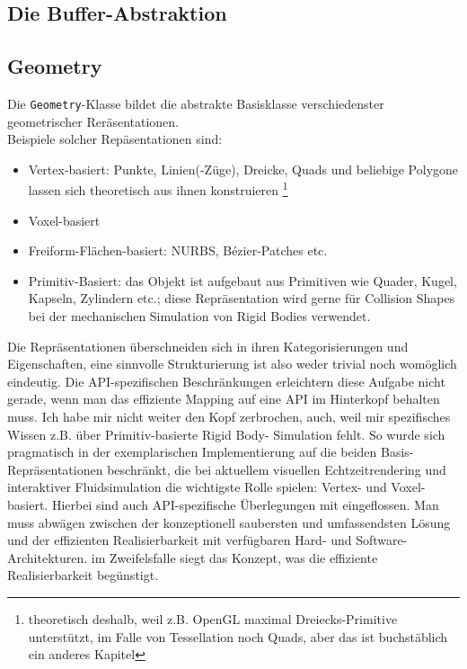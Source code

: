 	

    	
\subsection{Die Buffer-Abstraktion}  
	
		



\subsection{Geometry}
	\label{sec:geometry}
	Die \lstinline|Geometry|-Klasse bildet die abstrakte Basisklasse verschiedenster geometrischer Reräsentationen.\\
	Beispiele solcher Repäsentationen sind:
	\begin{itemize}
		\item Vertex-basiert:  Punkte, Linien(-Züge), Dreicke, Quads und beliebige Polygone lassen sich theoretisch
		aus ihnen konstruieren \footnote{theoretisch deshalb, weil z.B. OpenGL maximal Dreiecks-Primitive unterstützt, im 
		Falle von Tessellation noch Quads, aber das ist buchstäblich ein anderes Kapitel}
		\item Voxel-basiert
		\item Freiform-Flächen-basiert: NURBS, Bézier-Patches etc.
		\item Primitiv-Basiert: das Objekt ist aufgebaut aus Primitiven wie Quader, Kugel, Kapseln, Zylindern etc.;
			diese Repräsentation wird gerne für Collision Shapes bei der mechanischen Simulation von Rigid Bodies 
			verwendet.
	\end{itemize}
	Die Repräsentationen überschneiden sich in ihren Kategorisierungen und Eigenschaften, eine sinnvolle Strukturierung ist 
	also weder trivial noch womöglich eindeutig. Die API-spezifischen Beschränkungen erleichtern diese Aufgabe nicht 
	gerade, wenn man das effiziente Mapping auf eine API im Hinterkopf behalten muss.
	Ich habe mir nicht weiter den Kopf zerbrochen, auch, weil mir spezifisches Wissen z.B. über Primitiv-basierte
	Rigid Body- Simulation fehlt. So wurde sich pragmatisch in der exemplarischen Implementierung auf die
	beiden Basis-Repräsentationen beschränkt, die bei aktuellem visuellen Echtzeitrendering und interaktiver
	Fluidsimulation die wichtigste Rolle spielen: Vertex- und Voxel-basiert. Hierbei sind auch API-spezifische Überlegungen
	mit eingeflossen. Man muss abwägen zwischen der konzeptionell saubersten und umfassendsten Lösung
	und der effizienten Realisierbarkeit mit verfügbaren Hard- und Software-Architekturen.
	im Zweifelsfalle siegt das Konzept, was die effiziente Realisierbarkeit begünstigt.\\
	

